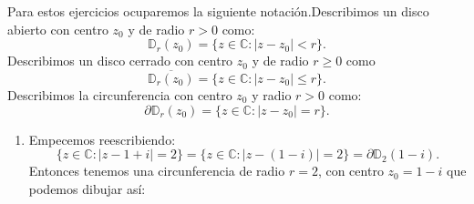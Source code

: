 \documentclass[twoside]{book}
\renewcommand{\Re}{\,\operatorname{Re}\,}
\renewcommand{\Im}{\,\operatorname{Im}\,}
\begin{document}
\begin{sol2}
    \begin{solucion}{}
        Para estos ejercicios ocuparemos la siguiente notaci\'on.Describimos un disco abierto con centro $z_0$ y de radio $r>0$ como:
        $$\mathbb{D}_r(z_0)=\{z\in\mathbb{C}:|z-z_0|<r\}.$$
        Describimos un disco cerrado con centro $z_0$ y de radio $r\geq0$ como
        $$\overline{\mathbb{D}_r(z_0)}=\{z\in\mathbb{C}:|z-z_0|\leq r\}.$$
        Describimos la circunferencia con centro $z_0$ y radio $r>0$ como:
        $$\partial\mathbb{D}_r(z_0)=\{z\in\mathbb{C}:|z-z_0|=r\}.$$
        \begin{enumerate}[label=\textsl{(\alph*)}]
            \newpage
            \item Empecemos reescribiendo:
                  $$\{z\in\mathbb{C}:|z-1+i|=2\}=\{z\in\mathbb{C}:|z-(1-i)|=2\}=\partial\mathbb{D}_2(1-i).$$
                  Entonces tenemos una circunferencia de radio $r=2$, con centro $z_0=1-i$ que podemos dibujar as\'i:
\end{enumerate}
\end{solucion}
\end{sol2}
\end{document}
